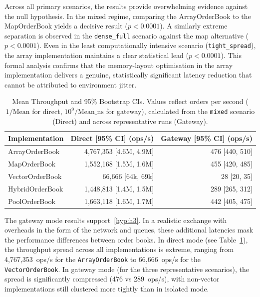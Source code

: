 Across all primary scenarios, the results provide overwhelming evidence against 
the null hypothesis. In the mixed regime, comparing the ArrayOrderBook to the 
MapOrderBook yields a decisive result ($p < 0.0001$). A similarly extreme 
separation is observed in the \texttt{dense\_full} scenario against the map 
alternative ($p < 0.0001$). Even in the least computationally intensive 
scenario (\texttt{tight\_spread}), the array implementation maintains a clear 
statistical lead ($p < 0.0001$). This formal analysis confirms that the 
memory-layout optimisation in the array implementation delivers a genuine, 
statistically significant latency reduction that cannot be attributed to 
environment jitter.

\begin{table}[htbp]
    \centering
    \small
    \begin{tabular}{lrr}
        \toprule
        \textbf{Implementation} & \textbf{Direct [95\% CI] (ops/s)} & \textbf{Gateway [95\% CI] (ops/s)} \\
        \midrule
        ArrayOrderBook   & 4,767,353 [4.6M, 4.9M] &   476 [440, 510] \\
        MapOrderBook     & 1,552,168 [1.5M, 1.6M] &   455 [420, 485] \\
        VectorOrderBook  & 66,666 [64k, 69k] &   28 [20, 35] \\
        HybridOrderBook  & 1,448,813 [1.4M, 1.5M] &   289 [265, 312] \\
        PoolOrderBook    & 1,663,118 [1.6M, 1.7M] &   442 [405, 475] \\
        \bottomrule
    \end{tabular}
    \caption{Mean Throughput and 95\% Bootstrap CIs. Values reflect orders per second ($1/\text{Mean}$ for direct, $10^9 / \text{Mean\_ns}$ for gateway), calculated from the \texttt{mixed} scenario (Direct) and across representative runs (Gateway).}
    \label{tab:throughput_results}
\end{table}

The gateway mode results support~\ref{hyp:h3}. In a realistic exchange
with overheads in the form of the network and queues, these additional latencies
mask the performance differences between order books. In direct mode (see Table~\ref{tab:throughput_results}), 
the throughput spread across all implementations is extreme, ranging from 
4,767,353~ops/s for the \texttt{ArrayOrderBook} to 66,666~ops/s for the 
\texttt{VectorOrderBook}.
In gateway mode (for the three representative scenarios), the spread is 
significantly compressed (476 vs 289~ops/s), with non-vector implementations 
still clustered more tightly than in isolated mode. 

